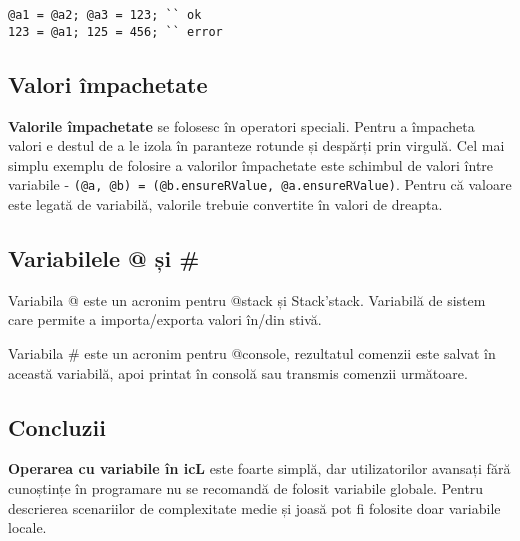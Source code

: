 \begin{lstlisting}[caption=Valori de stînga și dreapta, label=rlvalues]
@a1 = @a2; @a3 = 123; `` ok
123 = @a1; 125 = 456; `` error
\end{lstlisting}

\subsection{Valori împachetate}

{\bf Valorile împachetate} se folosesc în operatori speciali. Pentru a împacheta valori e destul de a le izola în paranteze rotunde și despărți prin virgulă. Cel mai simplu exemplu de folosire a valorilor împachetate este schimbul de valori între variabile - \lstinline|(@a, @b) = (@b.ensureRValue, @a.ensureRValue)|. Pentru că valoare este legată de variabilă, valorile trebuie convertite în valori de dreapta.

\subsection{Variabilele @ și \#}

{Variabila @} este un acronim pentru @stack și Stack'stack. Variabilă de sistem care permite a importa/exporta valori în/din stivă. 

{Variabila \#} este un acronim pentru @console, rezultatul comenzii este salvat în această variabilă, apoi printat în consolă sau transmis comenzii următoare.

\subsection{Concluzii}

{\bf Operarea cu variabile în icL} este foarte simplă, dar utilizatorilor avansați fără cunoștințe în programare nu se recomandă de folosit variabile globale. Pentru descrierea scenariilor de complexitate medie și joasă pot fi folosite doar variabile locale.
